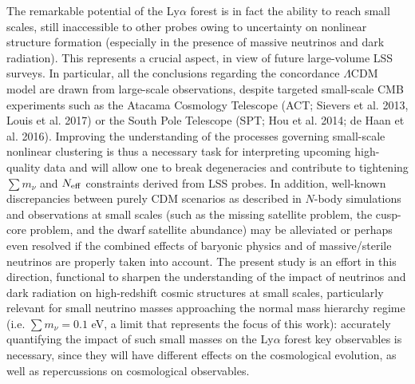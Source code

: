 \documentclass{emulateapj}
\begin{document}
The remarkable potential of the Ly$\alpha$ forest is in fact the ability to 
reach small scales, still inaccessible to other probes 
owing to uncertainty on nonlinear structure formation (especially in the presence of massive neutrinos and dark radiation).
This represents a crucial aspect, in view of future large-volume LSS surveys.
In particular, all the conclusions regarding the concordance $\Lambda$CDM model are
drawn from large-scale observations, despite targeted small-scale CMB experiments such as the Atacama Cosmology Telescope (ACT; Sievers et al. 2013, Louis et al. 2017) or
the South Pole Telescope (SPT; Hou et al. 2014; de Haan et al. 2016). 
Improving the understanding of the processes governing 
small-scale nonlinear clustering is thus a necessary  task for interpreting upcoming high-quality data
and  will allow one to 
break degeneracies and  contribute to  tightening
$\sum m_{\nu}$ and $N_{\rm eff}$ constraints derived from LSS probes.
In addition, well-known discrepancies between purely CDM scenarios as described in $N$-body simulations and
observations at small scales (such as the missing satellite problem, the cusp-core problem, and the dwarf satellite abundance) may be alleviated or perhaps even 
resolved if 
the combined effects of baryonic physics and of massive/sterile neutrinos are properly taken into account.
The present study is an effort in this direction, 
functional to sharpen the understanding of the impact of neutrinos and dark radiation on high-redshift cosmic structures at small scales,  
particularly relevant for small neutrino masses approaching the normal mass hierarchy regime (i.e. $\sum m_{\nu} =0.1$ eV, a limit that represents the focus of this work): 
 accurately quantifying the impact of such small masses on the Ly$\alpha$ forest
key observables is necessary, since they will have different effects
on the cosmological evolution, as well as repercussions on cosmological observables. 
  
\end{document}
